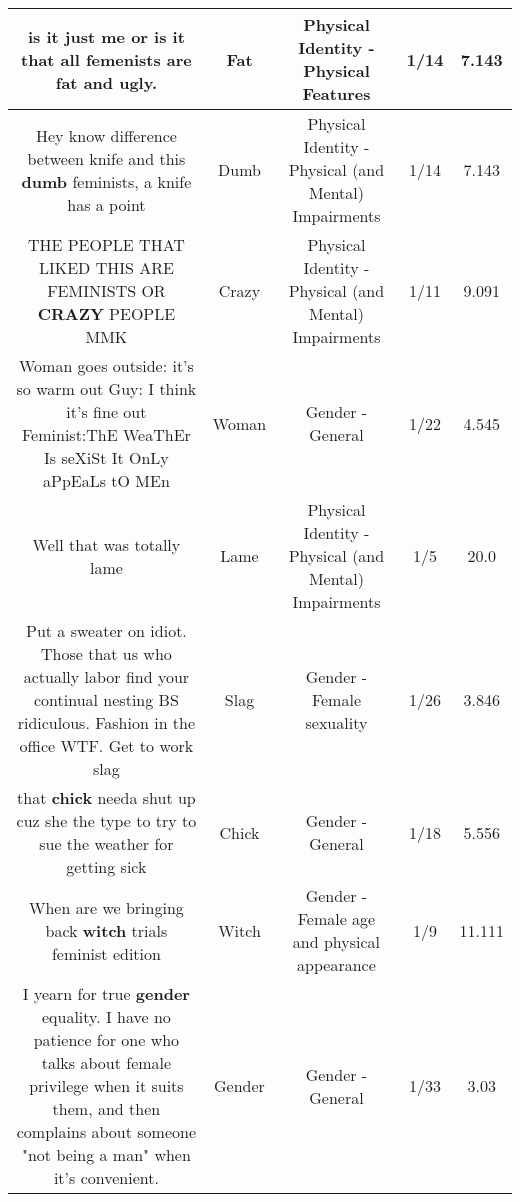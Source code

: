 \documentclass[11pt]{article}
\newlength\mylength
\begin{document}
\begin{center}
\begin{longtable}{|C{.65\mylength}|C{.30\mylength}|C{.12\mylength}|C{.12\mylength}|C{.12\mylength}|}
  \small is it just me or is it that all femenists are \textbf{fat} and ugly.\normalsize   & Fat & Physical Identity - Physical Features & 1/14 & 7.143 \\  \hline
  \small Hey know difference between knife and this \textbf{dumb} feminists, a knife has a point\normalsize   & Dumb & Physical Identity - Physical (and Mental) Impairments & 1/14 & 7.143 \\  \hline
  \small THE PEOPLE THAT LIKED THIS ARE FEMINISTS OR \textbf{CRAZY} PEOPLE MMK\normalsize   & Crazy & Physical Identity - Physical (and Mental) Impairments & 1/11 & 9.091 \\  \hline
  \small Woman goes outside: it's so warm out Guy: I think it's fine out Feminist:ThE WeaThEr Is seXiSt It OnLy aPpEaLs tO MEn\normalsize   & Woman & Gender - General & 1/22 & 4.545 \\  \hline
  \small Well that was totally lame\normalsize   & Lame & Physical Identity - Physical (and Mental) Impairments & 1/5 & 20.0 \\  \hline
  \small Put a sweater on idiot. Those that us who actually labor find your continual nesting BS ridiculous. Fashion in the office WTF. Get to work slag\normalsize   & Slag & Gender - Female sexuality & 1/26 & 3.846 \\  \hline
  \small that \textbf{chick} needa shut up cuz she the type to try to sue the weather for getting sick\normalsize   & Chick & Gender - General & 1/18 & 5.556 \\  \hline
  \small When are we bringing back \textbf{witch} trials feminist edition\normalsize   & Witch & Gender - Female age and physical appearance & 1/9 & 11.111 \\  \hline
  \small I yearn for true \textbf{gender} equality. I have no patience for one who talks about female privilege when it suits them, and then complains about someone "not being a man" when it's convenient.\normalsize   & Gender & Gender - General & 1/33 & 3.03 \\  \hline

\end{longtable}
\end{center}
\end{document}

